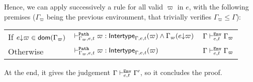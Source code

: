 \documentclass[a4paper]{article}
\theoremstyle{definition}
\begin{document}
  Hence, we can apply successively a  rule for all valid $\varpi$ in $e$,
  with the following premises ($\Gamma_\varpi$ being the previous environment, that trivially verifies $\Gamma_\varpi\leq\Gamma$):\\
  
  \begin{tabular}{lll}
    If $e{\downarrow}\varpi \in\textsf{dom}(\Gamma_\varpi)$&$\vdash^{\texttt{Path}}_{\Gamma_\varpi,e,t} \varpi: \textsf{Intertype}_{\Gamma,e,t} (\varpi)\land\Gamma_\varpi(e{\downarrow}\varpi)$&$\Gamma\vdash^{\texttt{Env}}_{e,t} {\Gamma_\varpi}$\\
    Otherwise&$\vdash^{\texttt{Path}}_{\Gamma_\varpi,e,t} \varpi: \textsf{Intertype}_{\Gamma,e,t} (\varpi)$&$\Gamma\vdash^{\texttt{Env}}_{e,t} {\Gamma_\varpi}$
  \end{tabular}

  At the end, it gives the judgement $\Gamma \vdash^{\texttt{Env}}_{e,t} \Gamma'$, so it concludes the proof.
\end{document}
